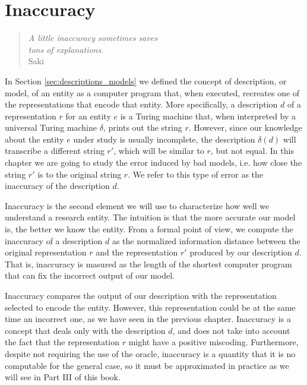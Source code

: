 %
%


\chapter{Inaccuracy}
\label{chap:Error}

\begin{quote}
\begin{flushright}
\emph{A little inaccuracy sometimes saves\\
tons of explanations.}\\
Saki
\end{flushright}
\end{quote}
\bigskip

In Section \ref{sec:descriptions_models} we defined the concept of description, or model, of an entity as a computer program that, when executed, recreates one of the representations that encode that entity. More specifically, a description $d$ of a representation $r$ for an entity $e$ is a Turing machine that, when interpreted by a universal Turing machine $\delta$, prints out the string $r$. However, since our knowledge about the entity $e$ under study is usually incomplete, the description $\delta(d)$ will transcribe a different string $r'$, which will be similar to $r$, but not equal. In this chapter we are going to study the error induced by bad models, i.e. how close the string $r'$ is to the original string $r$. We refer to this type of error as the inaccuracy of the description $d$.

Inaccuracy is the second element we will use to characterize how well we understand a research entity. The intuition is that the more accurate our model is, the better we know the entity. From a formal point of view, we compute the inaccuracy of a description $d$ as the normalized information distance between the original representation $r$ and the representation $r'$ produced by our description $d$. That is, inaccuracy is masured as the length of the shortest computer program that can fix the incorrect output of our model.

Inaccuracy compares the output of our description with the representation selected to encode the entity. However, this representation could be at the same time an incorrect one, as we have seen in the previous chapter. Inaccuracy is a concept that deals only with the description $d$, and does not take into account the fact that the representation $r$ might have a positive miscoding. Furthermore, despite not requiring the use of the oracle, inaccuracy is a quantity that it is no computable for the general case, so it must be approximated in practice as we will see in Part III of this book.

